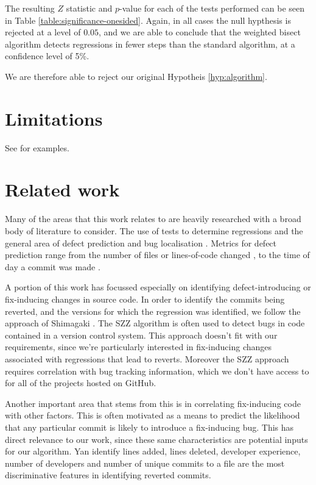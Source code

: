 \documentclass[10pt,journal,compsoc]{IEEEtran}
\begin{document}
The resulting $Z$ statistic and $p$-value for each of the tests performed can be seen in Table \ref{table:significance-onesided}. Again, in all cases the null hypthesis is rejected at a level of $0.05$, and we are able to conclude that the weighted bisect algorithm detects regressions in fewer steps than the standard algorithm, at a confidence level of 5\%.

We are therefore able to reject our original Hypotheis \ref{hyp:algorithm}.

\section{Limitations}

See \cite{moser2008} for examples.


\section{Related work}

Many of the areas that this work relates to are heavily researched with a broad body of literature to consider. The use of tests to determine regressions \cite{} and the general area of defect prediction and bug localisation \cite{kamei2013, shimagaki2016, yan2019}. Metrics for defect prediction range from the number of files or lines-of-code changed \cite{moser2008}, to the time of day a commit was made \cite{eyolfson2011}.

A portion of this work has focussed especially on identifying defect-introducing or fix-inducing changes in source code. In order to identify the commits being reverted, and the versions for which the regression was identified, we follow the approach of Shimagaki \etal \cite{shimagaki2016}. The SZZ algorithm \cite{sliwerski2005} is often used to detect bugs in code contained in a version control system. This approach doesn't fit with our requirements, since we're particularly interested in fix-inducing changes associated with regressions that lead to reverts. Moreover the SZZ approach requires correlation with bug tracking information, which we don't have access to for all of the projects hosted on GitHub.

Another important area that stems from this is in correlating fix-inducing code with other factors. This is often motivated as a means to predict the likelihood that any particular commit is likely to introduce a fix-inducing bug. This has direct relevance to our work, since these same characteristics are potential inputs for our algorithm. Yan \etal \cite{yan2019} identify lines added, lines deleted, developer experience, number of developers and number of unique commits to a file are the most discriminative features in identifying reverted commits.
\end{document}
